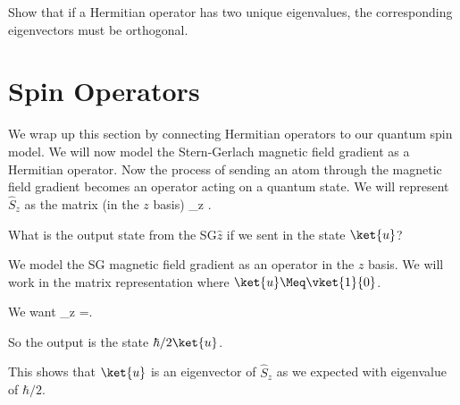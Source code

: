 \begin{exercise}
Show that if a Hermitian operator has two unique eigenvalues, the corresponding eigenvectors must be orthogonal.
\end{exercise}

\section{Spin Operators}
\label{sec:spinop}
\begin{marginfigure}\centering
{}
\end{marginfigure}


We wrap up this section by connecting Hermitian operators to our quantum spin model. We will now model the Stern-Gerlach magnetic field gradient as a Hermitian operator. Now the process of sending an atom through the magnetic field gradient becomes an operator acting on a quantum state. We will represent $\hat{S}_z$ as the matrix (in the $z$ basis)
\beq
{}_z \Meq {}\szmatrix .
\eeq
\begin{example}
What is the output state from the SG$\hat{z}$ if we sent in the state $\ket{u}$?

\model We model the SG magnetic field gradient as an operator in the $z$ basis. We will work in the matrix representation where $\ket{u} \Meq \vket{1}{0}$.

\vis 
\begin{figure}
\centering
{}
\end{figure}


\sol We want
\beq
{}_z \Meq {}\szmatrix{}=.
\eeq

So the output is the state $\hbar/2\ket{u}$. 

\assess This shows that $\ket{u}$ is an eigenvector of $\hat{S}_z$ as we expected with eigenvalue of $\hbar/2$.


\end{example}

